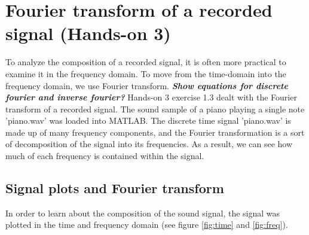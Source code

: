 \documentclass[journal]{IEEEtran}
\begin{document}
\section{Fourier transform of a recorded signal (Hands-on 3)}
To analyze the composition of a recorded signal, it is often more practical to examine it in the frequency domain. To move from the time-domain into the frequency domain, we use Fourier transform. 
\newline
\textit{\textbf{Show equations for discrete fourier and inverse fourier?}}
\newline
Hands-on 3 exercise 1.3 dealt with the Fourier transform of a recorded signal. The sound sample of a piano playing a single note 'piano.wav' was loaded into MATLAB. The discrete time signal 'piano.wav' is made up of many frequency components, and the Fourier transformation is a sort of decomposition of the signal into its frequencies. As a result, we can see how much of each frequency is contained within the signal.


\subsection{Signal plots and Fourier transform}
In order to learn about the composition of the sound signal, the signal was plotted in the time and frequency domain (see figure \ref{fig:time} and \ref{fig:freq}). 
\end{document}
